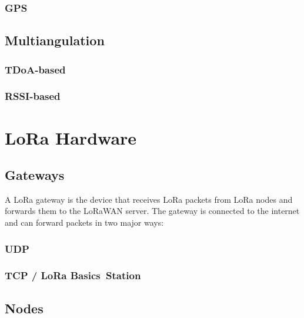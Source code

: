 \subsubsection{\ac{GPS}}

\subsection{Multiangulation}

\subsubsection{\ac{TDoA}-based}

\subsubsection{\ac{RSSI}-based}

\section{\ac{LoRa} Hardware}

\subsection{Gateways}

A \ac{LoRa} gateway is the device that receives \ac{LoRa} packets from \ac{LoRa} nodes and forwards them to the \ac{LoRaWAN} server.
The gateway is connected to the internet and can forward packets in two major ways:

\subsubsection{\acf{UDP}}

\subsubsection{\acf{TCP} / LoRa Basics\texttrademark~Station}

\subsection{Nodes}